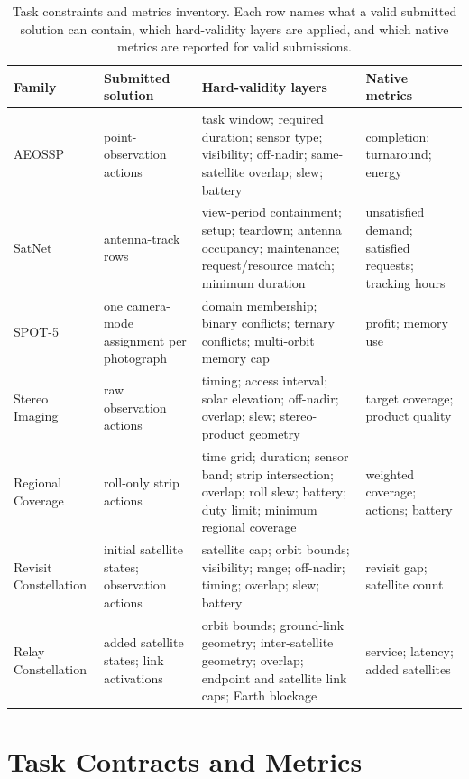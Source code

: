 \documentclass[]{mosi}
\begin{document}
\begin{table}[!t]
\centering
\scriptsize
\setlength{\tabcolsep}{3pt}
\renewcommand{\arraystretch}{1.15}
\begin{tabular}{>{\raggedright\arraybackslash}p{}>{\raggedright\arraybackslash}p{}>{\raggedright\arraybackslash}p{}>{\raggedright\arraybackslash}p{}}
\hline
\textbf{Family} & \textbf{Submitted solution} & \textbf{Hard-validity layers} & \textbf{Native metrics} \\
\hline
AEOSSP & point-observation actions & task window; required duration; sensor type; visibility; off-nadir; same-satellite overlap; slew; battery & completion; turnaround; energy \\
SatNet & antenna-track rows & view-period containment; setup; teardown; antenna occupancy; maintenance; request/resource match; minimum duration & unsatisfied demand; satisfied requests; tracking hours \\
SPOT-5 & one camera-mode assignment per photograph & domain membership; binary conflicts; ternary conflicts; multi-orbit memory cap & profit; memory use \\
Stereo Imaging & raw observation actions & timing; access interval; solar elevation; off-nadir; overlap; slew; stereo-product geometry & target coverage; product quality \\
Regional Coverage & roll-only strip actions & time grid; duration; sensor band; strip intersection; overlap; roll slew; battery; duty limit; minimum regional coverage & weighted coverage; actions; battery \\
Revisit Constellation & initial satellite states; observation actions & satellite cap; orbit bounds; visibility; range; off-nadir; timing; overlap; slew; battery & revisit gap; satellite count \\
Relay Constellation & added satellite states; link activations & orbit bounds; ground-link geometry; inter-satellite geometry; overlap; endpoint and satellite link caps; Earth blockage & service; latency; added satellites \\
\hline
\end{tabular}
\caption{Task constraints and metrics inventory. Each row names what a valid submitted solution can contain, which hard-validity layers are applied, and which native metrics are reported for valid submissions.}
\label{tab:task-inventory}
\end{table}

\section{Task Contracts and Metrics}
\label{app:task-contracts}
\end{document}
